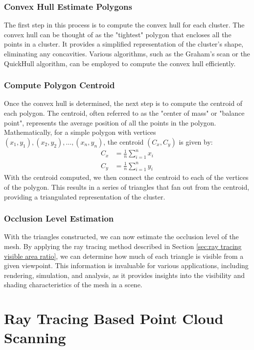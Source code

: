 \documentclass[11pt, a4paper,oneside,chapterprefix=false]{scrbook}
\begin{document}
\subsubsection{Convex Hull Estimate Polygons}

The first step in this process is to compute the convex hull for each cluster. The convex hull can be thought of as the "tightest" polygon that encloses all the points in a cluster. It provides a simplified representation of the cluster's shape, eliminating any concavities. Various algorithms, such as the Graham's scan or the QuickHull algorithm, can be employed to compute the convex hull efficiently.

\subsubsection{Compute Polygon Centroid}

Once the convex hull is determined, the next step is to compute the centroid of each polygon. The centroid, often referred to as the "center of mass" or "balance point", represents the average position of all the points in the polygon. Mathematically, for a simple polygon with vertices \( (x_1, y_1), (x_2, y_2), \ldots, (x_n, y_n) \), the centroid \( (C_x, C_y) \) is given by:
\begin{align*}
C_x &= \frac{1}{n} \sum_{i=1}^{n} x_i \\
C_y &= \frac{1}{n} \sum_{i=1}^{n} y_i
\end{align*}
With the centroid computed, we then connect the centroid to each of the vertices of the polygon. This results in a series of triangles that fan out from the centroid, providing a triangulated representation of the cluster.

\subsubsection{Occlusion Level Estimation}

With the triangles constructed, we can now estimate the occlusion level of the mesh. By applying the ray tracing method described in Section \ref{sec:ray tracing visible area ratio}, we can determine how much of each triangle is visible from a given viewpoint. This information is invaluable for various applications, including rendering, simulation, and analysis, as it provides insights into the visibility and shading characteristics of the mesh in a scene.


\section{Ray Tracing Based Point Cloud Scanning} \label{sec:ray tracing point cloud scanning}
\end{document}
